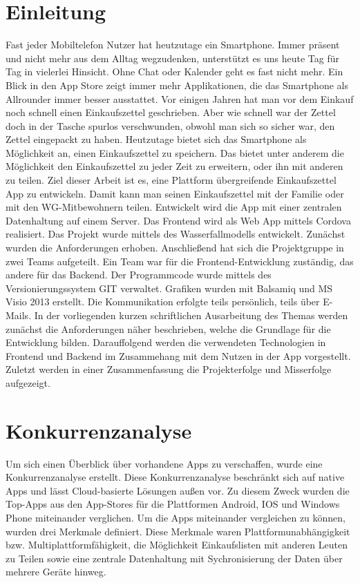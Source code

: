 \documentclass[10pt, conference, compsocconf]{IEEEtran}
\begin{document}
\section{Einleitung}
Fast jeder Mobiltelefon Nutzer hat heutzutage ein Smartphone. Immer pr\"asent und nicht mehr aus dem Alltag wegzudenken, unterst\"utzt es uns heute Tag f\"ur Tag in vielerlei Hinsicht. Ohne Chat oder Kalender geht es fast nicht mehr. Ein Blick in den App Store zeigt immer mehr Applikationen, die das Smartphone als Allrounder immer besser ausstattet. 
Vor einigen Jahren hat man vor dem Einkauf noch schnell einen Einkaufszettel geschrieben. Aber wie schnell war der Zettel doch in der Tasche spurlos verschwunden, obwohl man sich so sicher war, den Zettel eingepackt zu haben. Heutzutage bietet sich das Smartphone als M\"oglichkeit an, einen Einkaufszettel zu speichern. Das bietet unter anderem die M\"oglichkeit den Einkaufszettel zu jeder Zeit zu erweitern, oder ihn mit anderen zu teilen. 
Ziel dieser Arbeit ist es, eine Plattform \"ubergreifende Einkaufszettel App zu entwickeln. Damit kann man seinen Einkaufszettel mit der Familie oder mit den WG-Mitbewohnern teilen. Entwickelt wird die App mit einer zentralen Datenhaltung auf einem Server. Das Frontend wird als Web App mittels Cordova realisiert. Das Projekt wurde mittels des Wasserfallmodells entwickelt. Zun\"achst wurden die Anforderungen erhoben. Anschlie{\ss}end hat sich die Projektgruppe in zwei Teams aufgeteilt. Ein Team war f\"ur die Frontend-Entwicklung zust\"andig, das andere f\"ur das Backend. Der Programmcode wurde mittels des Versionierungssystem GIT verwaltet. Grafiken wurden mit Balsamiq und MS Visio 2013 erstellt. Die Kommunikation erfolgte teils pers\"onlich, teils \"uber E-Mails.
In der vorliegenden kurzen schriftlichen Ausarbeitung des Themas werden zun\"achst die Anforderungen n\"aher beschrieben, welche die Grundlage f\"ur die Entwicklung bilden. Darauffolgend werden die verwendeten Technologien in Frontend und Backend im Zusammehang mit dem Nutzen in der App vorgestellt. Zuletzt werden in einer Zusammenfassung die Projekterfolge und Misserfolge aufgezeigt.

\section{Konkurrenzanalyse}
Um sich einen \"Uberblick \"uber vorhandene Apps zu verschaffen, wurde eine Konkurrenzanalyse erstellt.
Diese Konkurrenzanalyse beschr\"ankt sich auf native Apps und l\"asst Cloud-basierte L\"osungen au{\ss}en vor.
Zu diesem Zweck wurden die Top-Apps aus den App-Stores f\"ur die Plattformen Android, IOS und Windows Phone miteinander verglichen.
Um die Apps miteinander vergleichen zu k\"onnen, wurden drei Merkmale definiert. 
Diese Merkmale waren Plattformunabh\"angigkeit bzw. Multiplattformf\"ahigkeit, 
die M\"oglichkeit Einkaufslisten mit anderen Leuten zu Teilen sowie eine zentrale Datenhaltung mit Sychronisierung der Daten \"uber mehrere Ger\"ate hinweg.
\end{document}
